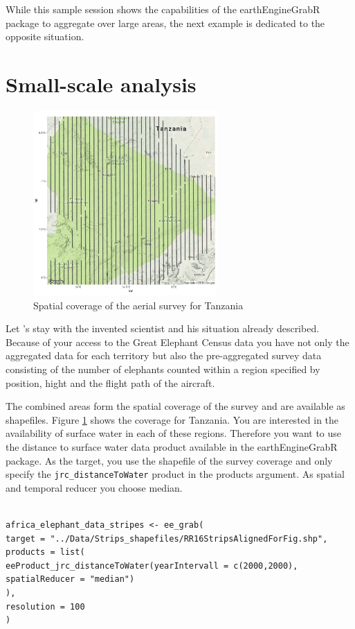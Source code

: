 While this sample session shows the capabilities of the earthEngineGrabR package to aggregate over large areas, the next example is dedicated to the opposite situation. 

\section{Small-scale analysis}

\begin{figure}
	\begin{center}
		\includegraphics[width=7cm]{images/stripes-cropped.pdf}
		\caption{Spatial coverage of the aerial survey for Tanzania}
		\label{stripes}
	\end{center}
\end{figure}


Let 's stay with the invented scientist and his situation already described. Because of your access to the Great Elephant Census data you have not only the aggregated data for each territory but also the pre-aggregated survey data consisting of the number of elephants counted within a region specified by position, hight and the flight path of the aircraft.


The combined areas form the spatial coverage of the survey and are available as shapefiles.
Figure \ref{stripes} shows the coverage for Tanzania. You are interested in the availability of surface water in each of these regions. Therefore you want to use the distance to surface water data product available in the earthEngineGrabR package. 
As the target, you use the shapefile of the survey coverage and only specify the \texttt{jrc\_distanceToWater} product in the products argument. As spatial and temporal reducer you choose median. 

\begin{lstlisting}

africa_elephant_data_stripes <- ee_grab(
target = "../Data/Strips_shapefiles/RR16StripsAlignedForFig.shp", 
products = list(
eeProduct_jrc_distanceToWater(yearIntervall = c(2000,2000), spatialReducer = "median")
),
resolution = 100
)
\end{lstlisting}




